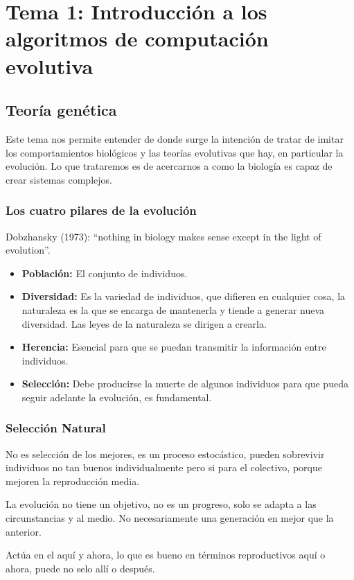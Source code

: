 \documentclass[12pt, twoside, openright]{report} %
\begin{document}
\chapter{Tema 1: Introducción a los algoritmos de computación evolutiva}
\section{Teoría genética}
Este tema nos permite entender de donde surge la intención de tratar de imitar los comportamientos biológicos y las teorías evolutivas que hay, en particular la evolución. Lo que trataremos es de acercarnos a como la biología es capaz de crear sistemas complejos.

\subsection{Los cuatro pilares de la evolución}
Dobzhansky (1973): “nothing in biology makes sense except in the light of evolution”.

\begin{itemize}
	\item \textbf{Población:} El conjunto de individuos.
	\item \textbf{Diversidad:} Es la variedad de individuos, que difieren en cualquier cosa, la naturaleza es la que se encarga de mantenerla y tiende a generar nueva diversidad. Las leyes de la naturaleza se dirigen a crearla.
	\item \textbf{Herencia:} Esencial para que se puedan transmitir la información entre individuos.
	\item \textbf{Selección:} Debe producirse la muerte de algunos individuos para que pueda seguir adelante la evolución, es fundamental.
\end{itemize}

\subsection{Selección Natural}
No es selección de los mejores, es un proceso estocástico, pueden sobrevivir individuos no tan buenos individualmente  pero si para el colectivo, porque mejoren la reproducción media.

La evolución no tiene un objetivo, no es un progreso, solo se adapta a las circunstancias y al medio. No necesariamente una generación en mejor que la anterior.

Actúa en el aquí y ahora, lo que es bueno en términos reproductivos aquí o ahora, puede no selo allí o después.
\end{document}
